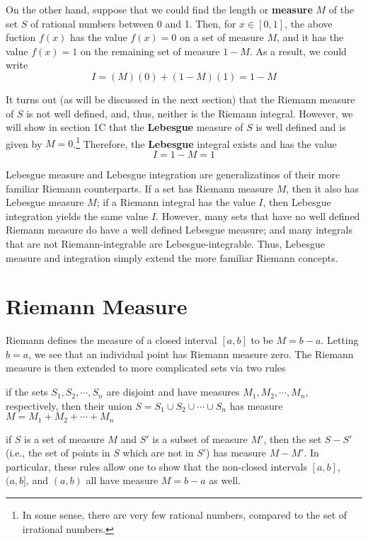On the other hand, suppose that we could find the length or
\textbf{measure} $M$ of the set $S$ of rational numbers between 0 and 1.
Then, for $x \in [0, 1]$, the above fuction $f(x)$ has the value
$f(x) = 0$ on a set of measure $M$, and it has the value $f(x) = 1$ on
the remaining set of measure $1 - M$.  As a result, we could write
%
\begin{equation*}
  I = (M)(0) + (1-M)(1) = 1 - M
\end{equation*}
%

It turns out (as will be discussed in the next section) that the
Riemann measure of $S$ is not well defined, and, thus, neither is the
Riemann integral.  However, we will show in section 1C that the
\textbf{Lebesgue} measure of $S$ is well defined and is given by
$M = 0$.\footnote{
  In some sense, there are very few rational numbers, compared to the
  set of irrational numbers.}
Therefore, the \textbf{Lebesgue} integral exists and has the value
%
\begin{equation*}
  I = 1 - M = 1
\end{equation*}
%

Lebesgue measure and Lebesgue integration are generalizatinos of their
more familiar Riemann counterparts.  If a set has Riemann measure $M$,
then it also has Lebesgue measure $M$; if a Riemann integral has the
value $I$, then Lebesgue integration yields the same value $I$.
However, many sets that have no well defined Riemann measure do have a
well defined Lebesgue measure; and many integrals that are not
Riemann-integrable are Lebesgue-integrable.  Thus, Lebesgue measure
and integration simply extend the more familiar Riemann concepts.
%
\section{Riemann Measure}
%
Riemann defines the measure of a closed interval $[a, b]$ to be
$M = b - a$.  Letting $b = a$, we see that an individual point has Riemann
measure zero.  The Riemann measure is then extended to more
complicated sets via two rules
\begin{enumerate*}
\item
  if the sets $S_1, S_2, \cdots, S_n$ are disjoint and have
  measures $M_1, M_2, \cdots, M_n$, respectively, then their union
  $S = S_1 \cup S_2 \cup \cdots \cup S_n$ has measure
  $M = M_1 + M_2 + \cdots + M_n$
\item
  if $S$ is a set of measure $M$ and $S'$ is a subset of measure
  $M'$, then the set $S - S'$ (i.e., the set of points in $S$
  which are not in $S'$) has measure $M - M'$.  In particular, these
  rules allow one to show that the non-closed intervals
  $[a, b]$, $(a, b]$, and $(a, b)$ all have measure $M = b - a$ as well.
\end{enumerate*}

